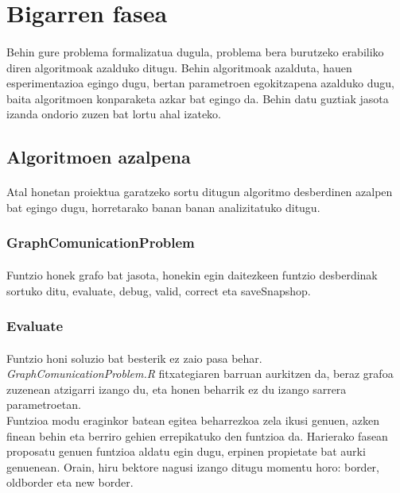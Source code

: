 \documentclass[eu,gi]{ifirak}\usepackage[]{graphicx}\usepackage[]{color}
\begin{document}
\pagebreak
\section{Bigarren fasea}
\paragraph{}
	Behin gure problema formalizatua dugula, problema bera burutzeko erabiliko diren algoritmoak azalduko ditugu. Behin algoritmoak azalduta, hauen esperimentazioa egingo dugu, bertan parametroen egokitzapena azalduko dugu, baita algoritmoen konparaketa azkar bat egingo da. Behin datu guztiak jasota izanda ondorio zuzen bat lortu ahal izateko.


\subsection{Algoritmoen azalpena}
\paragraph{}
	Atal honetan proiektua garatzeko sortu ditugun algoritmo desberdinen azalpen bat egingo dugu, horretarako banan banan analizitatuko ditugu.

\subsubsection{GraphComunicationProblem}
\paragraph{}
	Funtzio honek grafo bat jasota, honekin egin daitezkeen funtzio desberdinak sortuko ditu, evaluate, debug, valid, correct eta saveSnapshop.

\subsubsection{Evaluate} 
\paragraph{}
	  Funtzio honi soluzio bat besterik ez zaio pasa behar. \textit{GraphComunicationProblem.R} fitxategiaren barruan aurkitzen da, beraz grafoa zuzenean atzigarri izango du, eta honen beharrik ez du izango sarrera parametroetan.\\

	Funtzioa modu eraginkor batean egitea beharrezkoa zela ikusi genuen, azken finean behin eta berriro gehien errepikatuko den funtzioa da. Harierako fasean proposatu genuen funtzioa aldatu egin dugu, erpinen propietate bat aurki genuenean. Orain, hiru bektore nagusi izango ditugu momentu horo: border, oldborder eta new border.\\
	
\end{document}
